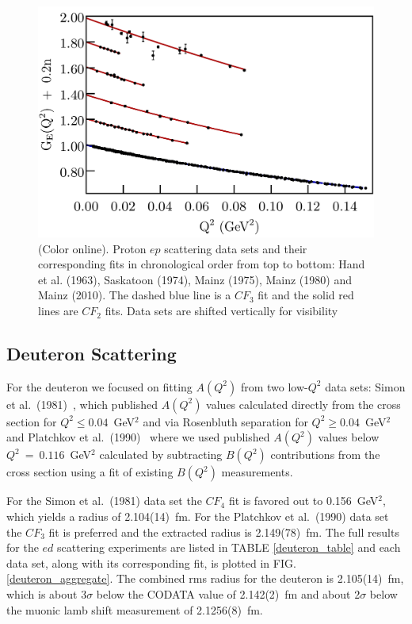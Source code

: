 \documentclass[aps,prd,twocolumn,groupedaddress,10pt]{revtex4-1}
\begin{document}
\begin{figure}[t]
\includegraphics[scale=0.40]{proton_aggregate_plot.pdf}
\caption{(Color online). Proton $ep$ scattering data sets and their corresponding fits in chronological order from top to bottom: Hand et al. (1963), Saskatoon (1974), Mainz (1975), Mainz (1980) and Mainz (2010). The dashed blue line is a ${CF}_3$ fit and the solid red lines are ${CF}_2$ fits. Data sets are shifted vertically for visibility}
\label{proton_aggregate}
\end{figure}

\subsection{Deuteron Scattering}
For the deuteron we focused on fitting $A(Q^2)$ from two low-$Q^2$ data sets: Simon et al.~(1981)~\cite{Simon1980}, which published $A(Q^2)$ values calculated directly from the cross section for $Q^2 \leq 0.04$~GeV$^2$ and via Rosenbluth separation for $Q^2 \geq 0.04$~GeV$^2$ and Platchkov et al.~(1990)~\cite{Platchkov1990} where we used published $A(Q^2)$ values below $Q^2~=~0.116$~GeV$^2$ calculated by subtracting $B(Q^2)$ contributions from the cross section using a fit of existing $B(Q^2)$ measurements.

For the Simon et al.~(1981) data set the ${CF}_4$ fit is favored out to 0.156~GeV$^2$, which yields a radius of 2.104(14)~fm. For the Platchkov et al.~(1990) data set the ${CF}_3$ fit is preferred and the extracted radius is 2.149(78)~fm. The full results for the $ed$ scattering experiments are listed in TABLE \ref{deuteron_table} and each data set, along with its corresponding fit, is plotted in FIG. \ref{deuteron_aggregate}. The combined rms radius for the deuteron is 2.105(14)~fm, which is about 3$\sigma$ below the CODATA value of 2.142(2)~fm and about 2$\sigma$ below the muonic lamb shift measurement of 2.1256(8)~fm.
\end{document}
